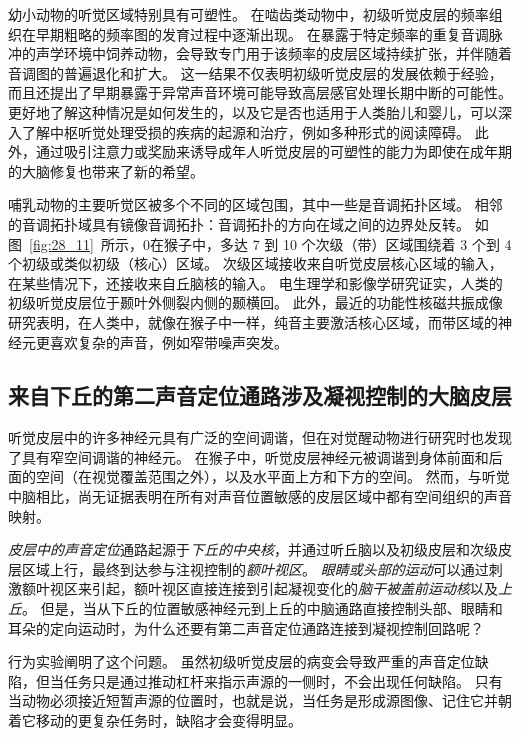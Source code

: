 幼小动物的听觉区域特别具有可塑性。
在啮齿类动物中，初级听觉皮层的频率组织在早期粗略的频率图的发育过程中逐渐出现。
在暴露于特定频率的重复音调脉冲的声学环境中饲养动物，会导致专门用于该频率的皮层区域持续扩张，并伴随着音调图的普遍退化和扩大。
这一结果不仅表明初级听觉皮层的发展依赖于经验，而且还提出了早期暴露于异常声音环境可能导致高层感官处理长期中断的可能性。
更好地了解这种情况是如何发生的，以及它是否也适用于人类胎儿和婴儿，可以深入了解中枢听觉处理受损的疾病的起源和治疗，例如多种形式的阅读障碍。
此外，通过吸引注意力或奖励来诱导成年人听觉皮层的可塑性的能力为即使在成年期的大脑修复也带来了新的希望。


哺乳动物的主要听觉区被多个不同的区域包围，其中一些是音调拓扑区域。
相邻的音调拓扑域具有镜像音调拓扑：音调拓扑的方向在域之间的边界处反转。
如图~\ref{fig:28_11}~所示，0在猴子中，多达 7 到 10 个次级（带）区域围绕着 3 个到 4 个初级或类似初级（核心）区域。
次级区域接收来自听觉皮层核心区域的输入，在某些情况下，还接收来自丘脑核的输入。
电生理学和影像学研究证实，人类的初级听觉皮层位于颞叶外侧裂内侧的颞横回。
此外，最近的功能性核磁共振成像研究表明，在人类中，就像在猴子中一样，纯音主要激活核心区域，而带区域的神经元更喜欢复杂的声音，例如窄带噪声突发。



\subsection{来自下丘的第二声音定位通路涉及凝视控制的大脑皮层}

听觉皮层中的许多神经元具有广泛的空间调谐，但在对觉醒动物进行研究时也发现了具有窄空间调谐的神经元。
在猴子中，听觉皮层神经元被调谐到身体前面和后面的空间（在视觉覆盖范围之外），以及水平面上方和下方的空间。
然而，与听觉中脑相比，尚无证据表明在所有对声音位置敏感的皮层区域中都有空间组织的声音映射。


\textit{皮层中的声音定位}通路起源于\textit{下丘的中央核}，并通过听丘脑以及初级皮层和次级皮层区域上行，最终到达参与注视控制的\textit{额叶视区}。
\textit{眼睛或头部的运动}可以通过刺激额叶视区来引起，额叶视区直接连接到引起凝视变化的\textit{脑干被盖前运动核}以及\textit{上丘}。
但是，当从下丘的位置敏感神经元到上丘的中脑通路直接控制头部、眼睛和耳朵的定向运动时，为什么还要有第二声音定位通路连接到凝视控制回路呢？


行为实验阐明了这个问题。
虽然初级听觉皮层的病变会导致严重的声音定位缺陷，但当任务只是通过推动杠杆来指示声源的一侧时，不会出现任何缺陷。
只有当动物必须接近短暂声源的位置时，也就是说，当任务是形成源图像、记住它并朝着它移动的更复杂任务时，缺陷才会变得明显。



